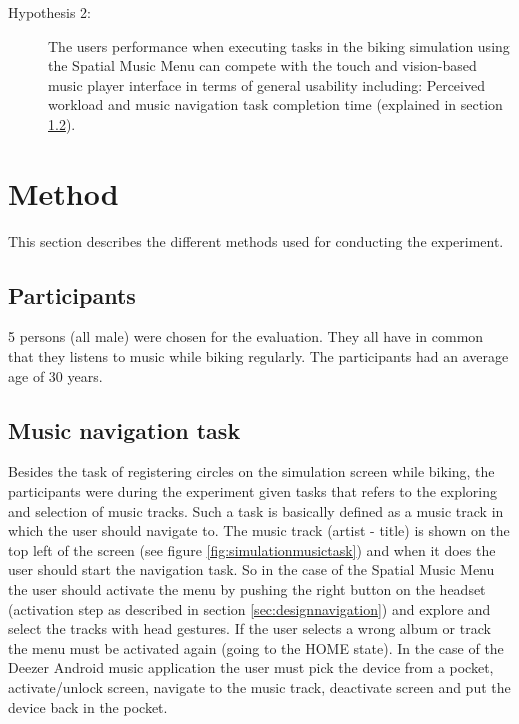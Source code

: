 \begin{description}
\item[Hypothesis 2:] The users performance when executing tasks in the biking simulation using the Spatial Music Menu can compete with the touch and vision-based music player interface in terms of general usability including: Perceived workload and music navigation task completion time (explained in section \ref{sec:evaluationmusictask}).
\end{description}


\section{Method}
This section describes the different methods used for conducting the experiment.

\subsection{Participants}
5 persons (all male) were chosen for the evaluation. They all have in common that they listens to music while biking regularly. The participants had an average age of 30 years.

\subsection{Music navigation task}
\label{sec:evaluationmusictask}
Besides the task of registering circles on the simulation screen while biking, the participants were during the experiment given tasks that refers to the exploring and selection of music tracks. Such a task is basically defined as a music track in which the user should navigate to. The music track (artist - title) is shown on the top left of the screen (see figure \ref{fig:simulationmusictask}) and when it does the user should start the navigation task. So in the case of the Spatial Music Menu the user should activate the menu by pushing the right button on the headset (activation step as described in section \ref{sec:designnavigation}) and explore and select the tracks with head gestures. If the user selects a wrong album or track the menu must be activated again (going to the HOME state). In the case of the Deezer Android music application the user must pick the device from a pocket, activate/unlock screen, navigate to the music track, deactivate screen and put the device back in the pocket.

